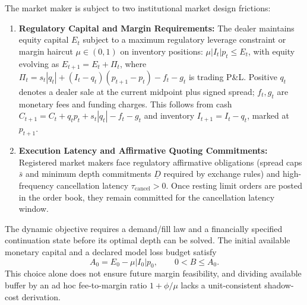\documentclass[12pt]{article}
\theoremstyle{definition}
\theoremstyle{remark}
\begin{document}
The market maker is subject to two institutional market design frictions:
\begin{enumerate}
    \item \textbf{Regulatory Capital and Margin Requirements:} The dealer maintains equity capital $E_t$ subject to a maximum regulatory leverage constraint or margin haircut $\mu \in (0, 1)$ on inventory positions: $\mu |I_t| p_t \le E_t$, with equity evolving as $E_{t+1} = E_t + \Pi_t$, where $\Pi_t = s_t |q_t| + (I_t-q_t)(p_{t+1}-p_t)-f_t-g_t$ is trading P\&L. Positive $q_t$ denotes a dealer sale at the current midpoint plus signed spread; $f_t,g_t$ are monetary fees and funding charges. This follows from cash $C_{t+1}=C_t+q_tp_t+s_t|q_t|-f_t-g_t$ and inventory $I_{t+1}=I_t-q_t$, marked at $p_{t+1}$.
    \item \textbf{Execution Latency and Affirmative Quoting Commitments:} Registered market makers face regulatory affirmative obligations (spread caps $\bar{s}$ and minimum depth commitments $\underline{D}$ required by exchange rules) and high-frequency cancellation latency $\tau_{\text{cancel}} > 0$. Once resting limit orders are posted in the order book, they remain committed for the cancellation latency window.
\end{enumerate}

The dynamic objective requires a demand/fill law and a financially specified continuation state before its optimal depth can be solved. The initial available monetary capital and a declared model loss budget satisfy
\begin{equation}
A_0=E_0-\mu|I_0|p_0,\qquad 0<B\le A_0.
\label{eq:dealer_buffer}
\end{equation}
This choice alone does not ensure future margin feasibility, and dividing available buffer by an ad hoc fee-to-margin ratio $1+\phi/\mu$ lacks a unit-consistent shadow-cost derivation.
\end{document}
